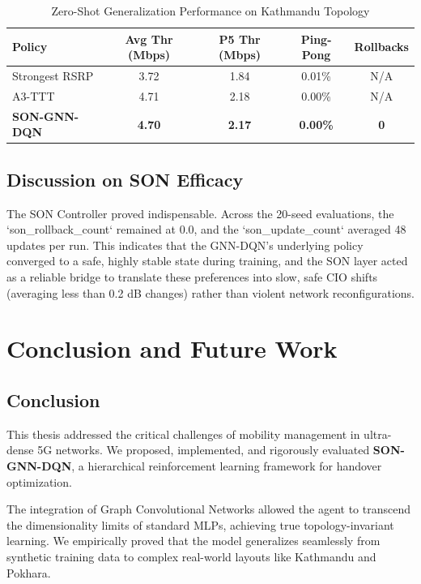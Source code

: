 \documentclass[12pt,a4paper,oneside]{report}
\begin{document}
\begin{table}[htbp]
\centering
\caption{Zero-Shot Generalization Performance on Kathmandu Topology}
\label{tab:kathmandu}
\begin{tabular}{@{}lcccc@{}}
\toprule
\textbf{Policy} & \textbf{Avg Thr (Mbps)} & \textbf{P5 Thr (Mbps)} & \textbf{Ping-Pong} & \textbf{Rollbacks} \\ \midrule
Strongest RSRP & 3.72 & 1.84 & 0.01\% & N/A \\
A3-TTT & 4.71 & 2.18 & 0.00\% & N/A \\
\textbf{SON-GNN-DQN} & \textbf{4.70} & \textbf{2.17} & \textbf{0.00\%} & \textbf{0} \\ \bottomrule
\end{tabular}
\end{table}

\section{Discussion on SON Efficacy}
The SON Controller proved indispensable. Across the 20-seed evaluations, the `son_rollback_count` remained at 0.0, and the `son_update_count` averaged 48 updates per run. This indicates that the GNN-DQN's underlying policy converged to a safe, highly stable state during training, and the SON layer acted as a reliable bridge to translate these preferences into slow, safe CIO shifts (averaging less than 0.2 dB changes) rather than violent network reconfigurations.

\chapter{Conclusion and Future Work}
\label{ch:conclusion}

\section{Conclusion}
This thesis addressed the critical challenges of mobility management in ultra-dense 5G networks. We proposed, implemented, and rigorously evaluated \textbf{SON-GNN-DQN}, a hierarchical reinforcement learning framework for handover optimization. 

The integration of Graph Convolutional Networks allowed the agent to transcend the dimensionality limits of standard MLPs, achieving true topology-invariant learning. We empirically proved that the model generalizes seamlessly from synthetic training data to complex real-world layouts like Kathmandu and Pokhara.
\end{document}
